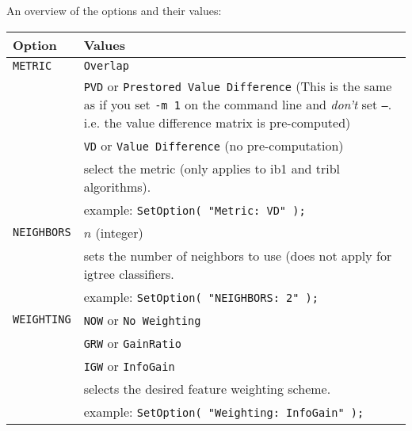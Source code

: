\documentclass{report}
\begin{document}
\noindent
An overview of the options and their values:\\[2ex]
\begin{tabular}{|l|p{12cm}|}
\hline
Option & Values\\
\hline
{\tt METRIC} &  {\tt Overlap}\\
	     &  {\tt PVD} or {\tt Prestored Value Difference} (This is
the same as if you set {\tt -m 1} on the command line and {\em don't}
set {\tt --}. i.e. the value difference matrix is pre-computed)\\
	     &  {\tt VD} or {\tt Value Difference} (no pre-computation)\\
	     & select the metric (only applies to {\sc ib1} and {\sc tribl} algorithms).\\
	     & example: {\tt SetOption( "Metric: VD" );}\\
\hline
{\tt NEIGHBORS} & $n$ (integer)\\
		 & sets the number of neighbors to use (does not apply
for {\sc igtree} classifiers.\\
		 & example: {\tt SetOption( "NEIGHBORS: 2" );}\\
\hline
{\tt WEIGHTING}  & {\tt NOW} or {\tt No Weighting}\\
                 &  {\tt GRW} or {\tt GainRatio}\\
                 &  {\tt IGW} or {\tt InfoGain}\\
		 & selects the desired feature weighting scheme.\\
		 & example: {\tt SetOption( "Weighting: InfoGain" );}\\
\hline
\end{tabular}
\end{document}
